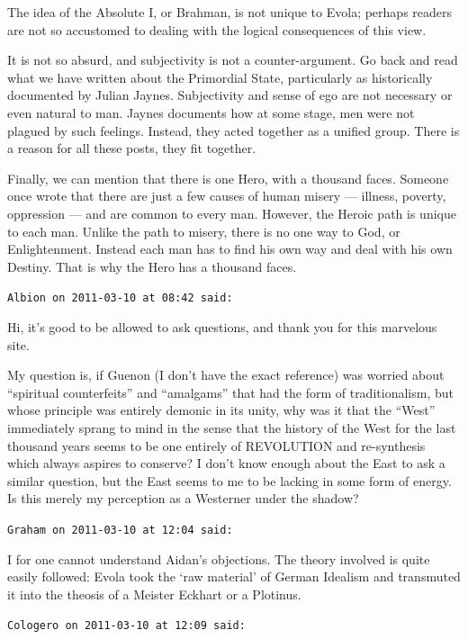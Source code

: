 \begin{footnotesize}
\begin{sffamily}
The idea of the Absolute I, or Brahman, is not unique to Evola; perhaps readers are not so accustomed to dealing with the logical consequences of this view.

It is not so absurd, and subjectivity is not a counter-argument. Go back and read what we have written about the Primordial State, particularly as historically documented by Julian Jaynes. Subjectivity and sense of ego are not necessary or even natural to man. Jaynes documents how at some stage, men were not plagued by such feelings. Instead, they acted together as a unified group. There is a reason for all these posts, they fit together.

Finally, we can mention that there is one Hero, with a thousand faces. Someone once wrote that there are just a few causes of human misery --- illness, poverty, oppression --- and are common to every man. However, the Heroic path is unique to each man. Unlike the path to misery, there is no one way to God, or Enlightenment. Instead each man has to find his own way and deal with his own Destiny. That is why the Hero has a thousand faces.

\hfill

\texttt{Albion on 2011-03-10 at 08:42 said:}

Hi, it's good to be allowed to ask questions, and thank you for this marvelous site.

My question is, if Guenon (I don't have the exact reference) was worried about ``spiritual counterfeits'' and ``amalgams'' that had the form of traditionalism, but whose principle was entirely demonic in its unity, why was it that the ``West'' immediately sprang to mind in the sense that the history of the West for the last thousand years seems to be one entirely of REVOLUTION and re-synthesis which always aspires to conserve? I don't know enough about the East to ask a similar question, but the East seems to me to be lacking in some form of energy. Is this merely my perception as a Westerner under the shadow?

\hfill

\texttt{Graham on 2011-03-10 at 12:04 said:}

I for one cannot understand Aidan's objections. The theory involved is quite easily followed: Evola took the `raw material' of German Idealism and transmuted it into the theosis of a Meister Eckhart or a Plotinus.

\hfill

\texttt{Cologero on 2011-03-10 at 12:09 said:}


\end{sffamily}
\end{footnotesize}
